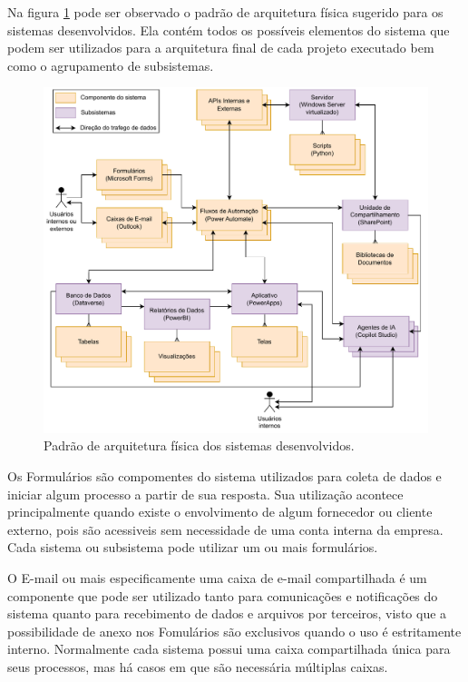 	Na figura \ref{fig:metodologia:arquiteturaFisica} pode ser observado o padrão de arquitetura física sugerido para os sistemas desenvolvidos. Ela contém todos os possíveis
	elementos do sistema que podem ser utilizados para a arquitetura final de cada projeto executado bem como o agrupamento de subsistemas.
	\begin{figure}[h]
		\centering
		\includegraphics[width=1\textwidth]{./figuras/arquiteturaFisica.pdf}
		\caption{Padrão de arquitetura física dos sistemas desenvolvidos.}
		\label{fig:metodologia:arquiteturaFisica}
	\end{figure}
	
	Os Formulários são compomentes do sistema utilizados para coleta de dados e iniciar algum processo a partir de sua resposta. Sua utilização acontece principalmente quando existe
	o envolvimento de algum fornecedor ou cliente externo, pois são acessiveis sem necessidade de uma conta interna da empresa. Cada sistema ou subsistema pode utilizar um ou mais formulários.

	O E-mail ou mais especificamente uma caixa de e-mail compartilhada é um componente que pode ser utilizado tanto para comunicações e notificações do sistema quanto para recebimento de dados
	e arquivos por terceiros, visto que a possibilidade de anexo nos Fomulários são exclusivos quando o uso é estritamente interno. Normalmente cada sistema possui uma caixa compartilhada única
	para seus processos, mas há casos em que são necessária múltiplas caixas.

